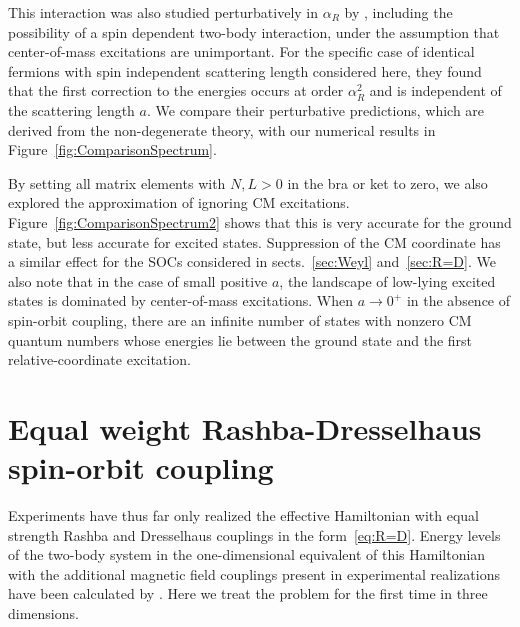 \documentclass[%
 notitlepage,
 preprint,
showpacs,%
 amsmath,amssymb,
 aps,
pra,
]{revtex4-1}
\begin{document}
This interaction was also studied perturbatively in $\alpha_R$ by \cite{PhysRevA.89.033606}, including the possibility of a spin dependent two-body interaction, under the assumption that center-of-mass excitations are unimportant. For the specific case of identical fermions with spin independent scattering length considered here, they found that the first correction to the energies occurs at order $\alpha_R^2$ and is independent of the scattering length $a$. We compare their perturbative predictions, which are derived from the non-degenerate theory, with our numerical results in Figure~\ref{fig:ComparisonSpectrum}. 

By setting all matrix elements with $N,L>0$ in the bra or ket to zero, we also explored the approximation of ignoring CM excitations. Figure~\ref{fig:ComparisonSpectrum2} shows that this is very accurate for the ground state, but less accurate for excited states. Suppression of the CM coordinate has a similar effect for the SOCs considered in sects.~\ref{sec:Weyl} and~\ref{sec:R=D}. We also note that in the case of small positive $a$, the landscape of low-lying excited states is dominated by center-of-mass excitations. When $a\rightarrow0^+$ in the absence of spin-orbit coupling, there are an infinite number of states with nonzero CM quantum numbers whose energies lie between the ground state and the first relative-coordinate excitation.


\section{\label{sec:R=D} Equal weight Rashba-Dresselhaus spin-orbit coupling}

Experiments have thus far only realized the effective Hamiltonian with equal strength Rashba and Dresselhaus couplings in the form~\eqref{eq:R=D}. Energy levels of the two-body system in the one-dimensional equivalent of this Hamiltonian with the additional magnetic field couplings present in experimental realizations have been calculated by \cite{guan2014energy}. Here we treat the problem for the first time in three dimensions.
\end{document}
